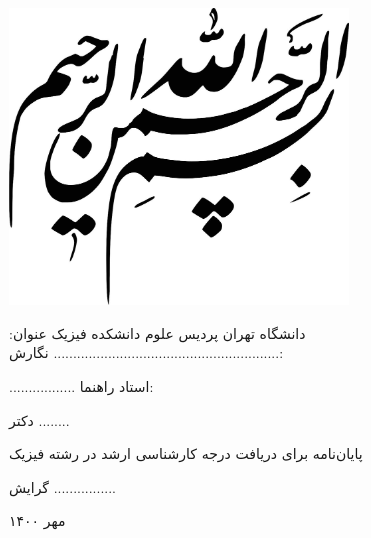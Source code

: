 \documentclass[a4paper,oneside]{book}
\begin{document}
\newpage
	\thispagestyle{empty}
	\vspace*{50mm}
	\begin{center}
		\includegraphics[width=90mm]{./default_pics/besm.png}
	\end{center}
	\newpage
	\thispagestyle{empty}
	\begin{center}

		
		\vspace{0.5cm}
		{\Huge دانشگاه تهران}
		\linebreak
		\linebreak
		{\huge پردیس علوم}
		\linebreak
		\linebreak
		{\LARGE دانشکده فیزیک}
		\linebreak
		\linebreak
		\linebreak
		\linebreak	
			\vspace{0.5cm}
		{\LARGE عنوان:}
				\linebreak
		{\LARGE
			..........................................................}
		\linebreak
		\linebreak
		\linebreak
		\linebreak
		{\LARGE نگارش:}
					\vspace{0.5cm}
					
		{\LARGE .................}
		\linebreak
		\linebreak
		\linebreak
		\linebreak
		{\LARGE استاد راهنما:}
		
		{\LARGE دکتر ........}
		\linebreak
		\linebreak
		\linebreak
		{\LARGE پایان‌نامه برای دریافت درجه کارشناسی ارشد در رشته فیزیک
			
			گرایش ................}
		\linebreak
		\linebreak
		\linebreak
		\linebreak
		\linebreak
		\linebreak
		{\LARGE  مهر ۱۴۰۰}
	\end{center}
\end{document}
